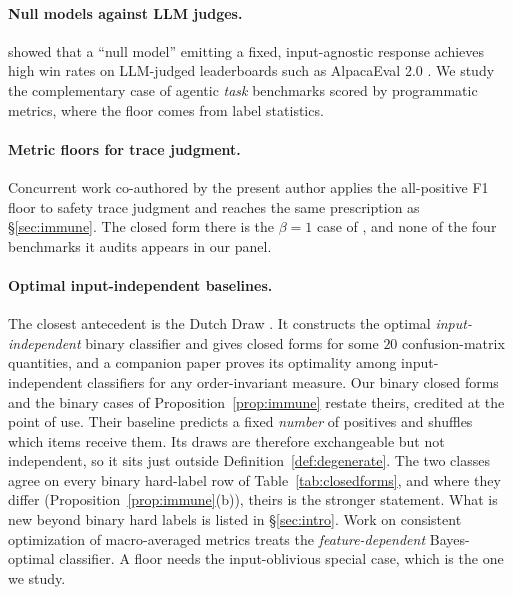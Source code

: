 \documentclass{article}
\theoremstyle{plain}
\theoremstyle{definition}
\begin{document}
\paragraph{Null models against LLM judges.}
\citet{zheng2024cheating} showed that a ``null model'' emitting a fixed, input-agnostic response achieves high win rates on LLM-judged leaderboards such as AlpacaEval 2.0 \citep{dubois2024length}. We study the complementary case of agentic \emph{task} benchmarks scored by programmatic metrics, where the floor comes from label statistics.

\paragraph{Metric floors for trace judgment.}
Concurrent work co-authored by the present author \citep{wang2026safety} applies the all-positive F1 floor to safety trace judgment and reaches the same prescription as \S\ref{sec:immune}. The closed form there is the $\beta = 1$ case of \citet{vandebijl2022dutchdraw}, and none of the four benchmarks it audits appears in our panel.

\paragraph{Optimal input-independent baselines.}
The closest antecedent is the Dutch Draw \citep{vandebijl2022dutchdraw,pries2023optimal}. It constructs the optimal \emph{input-independent} binary classifier and gives closed forms for some $20$ confusion-matrix quantities, and a companion paper proves its optimality among input-independent classifiers for any order-invariant measure. Our binary closed forms and the binary cases of Proposition~\ref{prop:immune} restate theirs, credited at the point of use. Their baseline predicts a fixed \emph{number} of positives and shuffles which items receive them. Its draws are therefore exchangeable but not independent, so it sits just outside Definition~\ref{def:degenerate}. The two classes agree on every binary hard-label row of Table~\ref{tab:closedforms}, and where they differ (Proposition~\ref{prop:immune}(b)), theirs is the stronger statement. What is new beyond binary hard labels is listed in \S\ref{sec:intro}. Work on consistent optimization of macro-averaged metrics \citep{schultheis2024macroatk} treats the \emph{feature-dependent} Bayes-optimal classifier. A floor needs the input-oblivious special case, which is the one we study.
\end{document}
